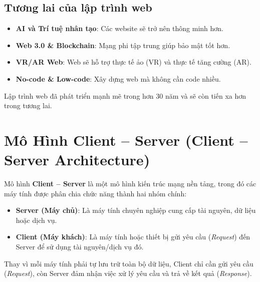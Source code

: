 \documentclass[11pt,oneside]{book}
\newcommand{\term}[1]{\textbf{\textcolor{primaryBlue}{#1}}}
\begin{document}
\subsection{Tương lai của lập trình web}

\begin{itemize}
    \item \textbf{AI và Trí tuệ nhân tạo}: Các website sẽ trở nên thông minh hơn.
    \item \textbf{Web 3.0 \& Blockchain}: Mạng phi tập trung giúp bảo mật tốt hơn.
    \item \textbf{VR/AR Web}: Web sẽ hỗ trợ thực tế ảo (VR) và thực tế tăng cường (AR).
    \item \textbf{No-code \& Low-code}: Xây dựng web mà không cần code nhiều.
\end{itemize}

\begin{noteBox}
Lập trình web đã phát triển mạnh mẽ trong hơn 30 năm và sẽ còn tiến xa hơn trong tương lai.
\end{noteBox}

\section{Mô Hình Client -- Server (Client -- Server Architecture)}
\label{sec:client_server}

Mô hình \term{Client -- Server} là một mô hình kiến trúc mạng nền tảng, trong đó các máy tính được phân chia chức năng thành hai nhóm chính:

\begin{itemize}
    \item \term{Server (Máy chủ)}: Là máy tính chuyên nghiệp cung cấp tài nguyên, dữ liệu hoặc dịch vụ.
    \item \term{Client (Máy khách)}: Là máy tính hoặc thiết bị gửi yêu cầu (\textit{Request}) đến Server để sử dụng tài nguyên/dịch vụ đó.
\end{itemize}

Thay vì mỗi máy tính phải tự lưu trữ toàn bộ dữ liệu, Client chỉ cần gửi yêu cầu (\textit{Request}), còn Server đảm nhận việc xử lý yêu cầu và trả về kết quả (\textit{Response}).
\end{document}
